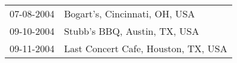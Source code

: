 \begin{supertabular}{ll}
 07-08-2004 &        Bogart's, Cincinnati, OH, USA \\
 09-10-2004 &         Stubb's BBQ, Austin, TX, USA \\
 09-11-2004 &  Last Concert Cafe, Houston, TX, USA \\
\end{supertabular}
